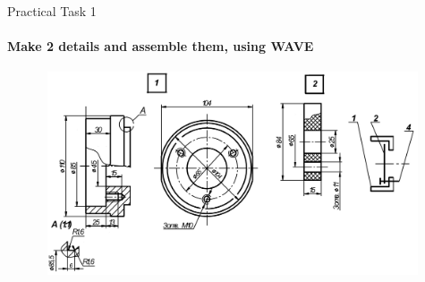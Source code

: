 \documentclass[aspectratio=169]{beamer}
\begin{document}
\begin{frame}[t]{Practical Task 1}
    \framesubtitle{Make 2 details and assemble them, using WAVE}
    \vspace{-0.6cm}
    \begin{figure}[H]
        \centering\includegraphics[height=6cm,width=1\textwidth,keepaspectratio]{practical_1.png}
        \label{fig:practical_1.png}
    \end{figure}
\end{frame}
\end{document}
